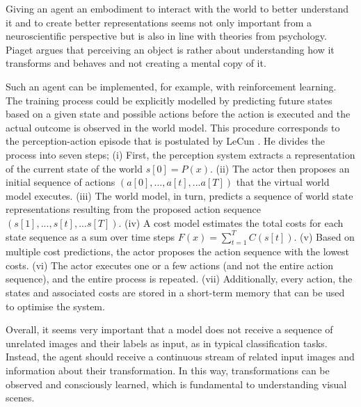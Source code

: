 Giving an agent an embodiment to interact with the world to better understand it and to create better representations seems not only important from a neuroscientific perspective but is also in line with theories from psychology.
Piaget  argues that perceiving an object is rather about understanding how it transforms and behaves and not creating a mental copy of it.

Such an agent can be implemented, for example, with reinforcement learning.
The training process could be explicitly modelled by predicting future states based on a given state and possible actions before the action is executed and the actual outcome is observed in the world model.
This procedure corresponds to the perception-action episode that is postulated by LeCun .
He divides the process into seven steps;
(i) First, the perception system extracts a representation of the current state of the world $s[0]=P(x)$. (ii) The actor then proposes an initial sequence of actions $(a[0], ..., a[t], ... a[T])$ that the virtual world model executes. (iii) The world model, in turn, predicts a sequence of world state representations resulting from the proposed action sequence $(s[1], ..., s[t], ... s[T])$. (iv) A cost model estimates the total costs for each state sequence as a sum over time steps $F(x)=\sum_{t=1}^{T}C(s[t])$. (v) Based on multiple cost predictions, the actor proposes the action sequence with the lowest costs. (vi) The actor executes one or a few actions (and not the entire action sequence), and the entire process is repeated. (vii) Additionally, every action, the states and associated costs are stored in a short-term memory that can be used to optimise the system.

Overall, it seems very important that a model does not receive a sequence of unrelated images and their labels as input, as in typical classification tasks. Instead, the agent should receive a continuous stream of related input images and information about their transformation. In this way, transformations can be observed and consciously learned, which is fundamental to understanding visual scenes.


